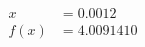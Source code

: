 \documentclass[preview]{standalone}
\begin{document}
\begin{align*}
x &= 0.0012\\f(x) &= 4.0091410
\end{align*}
\end{document}
